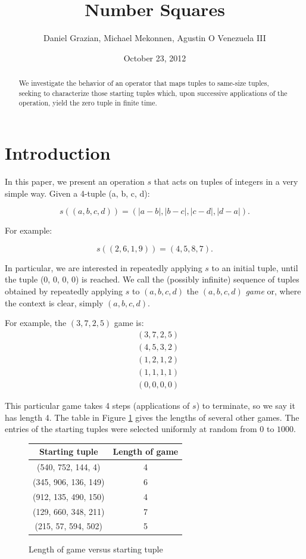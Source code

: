 \documentclass[12pt]{amsart}
\title{Number Squares}
\author{Daniel Grazian, Michael Mekonnen, Agustin O Venezuela III}
\date{October 23, 2012}
\newcommand{\diff}{s}
\begin{document}
\begin{abstract}
We investigate the behavior of an operator that maps tuples to same-size tuples, seeking to characterize those starting tuples which, upon successive applications of the operation, yield the zero tuple in finite time.
\end{abstract}

\maketitle

\section{Introduction\label{sec:intro}}

In this paper, we present an operation $\diff$ that acts on tuples of integers in a very simple way. Given a 4-tuple (a, b, c, d):

$$\diff((a, b, c, d)) = (|a - b|, |b - c|, |c - d|, |d - a|).$$ 

For example:

$$\diff((2, 6, 1, 9)) = (4, 5, 8, 7).$$

In particular, we are interested in repeatedly applying $\diff$ to an initial tuple, until the tuple (0, 0, 0, 0) is reached. We call the (possibly infinite) sequence of tuples obtained by repeatedly applying $\diff$ to $(a, b, c, d)$  the $(a, b, c, d)$ \textit{game} or, where the context is clear, simply $(a, b, c, d)$.

For example, the  $(3, 7, 2, 5)$ game is:
\begin{align*}
& (3, 7, 2, 5) \\
& (4, 5, 3, 2) \\
& (1, 2, 1, 2) \\
& (1, 1, 1, 1) \\
& (0, 0, 0, 0)
\end{align*}

This particular game takes 4 steps (applications of $\diff$) to terminate, so we say it has length 4. The table in Figure \ref{fig: lengthVersusStartingTuple} gives the lengths of several other games. The entries of the starting tuples were selected uniformly at random from $0$ to $1000$.

\begin{figure}
\caption{Length of game versus starting tuple}
\label{fig: lengthVersusStartingTuple}
\begin{center}
    \begin{tabular}{| c | c |}
    \hline
    Starting tuple &  Length of game\\ \hline
    (540, 752, 144, 4) & 4\\ \hline
    (345, 906, 136, 149) & 6\\ \hline
    (912, 135, 490, 150) & 4\\ \hline
    (129, 660, 348, 211) & 7 \\ \hline
    (215, 57, 594, 502) & 5 \\ \hline
    \end{tabular}
\end{center}
\end{figure}
\end{document}
